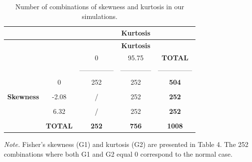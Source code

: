 \documentclass[
  english,
  man]{apa6}
\begin{document}
\begin{longtable}[]{@{}ccccc@{}}
\caption{Number of combinations of skewness and kurtosis in our simulations.}\tabularnewline
\toprule
& & & \textbf{Kurtosis} & \\
\midrule
\endfirsthead
\toprule
& & & \textbf{Kurtosis} & \\
\midrule
\endhead
& & 0 & 95.75 & \textbf{TOTAL} \\
& & --------------- & -------------- & --------------- \\
& 0 & 252 & 252 & \textbf{504} \\
& & & & \\
\textbf{Skewness} & -2.08 & / & 252 & \textbf{252} \\
& & & & \\
& 6.32 & / & 252 & \textbf{252} \\
& & & & \\
& \textbf{TOTAL} & \textbf{252} & \textbf{756} & \textbf{1008} \\
\bottomrule
\end{longtable}

\emph{Note.} Fisher's skewness (G1) and kurtosis (G2) are presented in Table 4. The 252 combinations where both G1 and G2 equal 0 correspond to the normal case.
\end{document}
